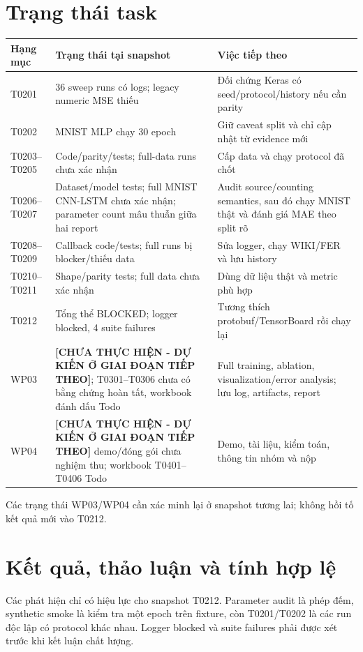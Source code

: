 \section{Trạng thái task}
\begin{longtable}{p{}p{}p{}}
\toprule Hạng mục & Trạng thái tại snapshot & Việc tiếp theo \\
\midrule
T0201 & 36 sweep runs có logs; legacy numeric MSE thiếu & Đối chứng Keras có seed/protocol/history nếu cần parity \\
T0202 & MNIST MLP chạy 30 epoch & Giữ caveat split và chỉ cập nhật từ evidence mới \\
T0203--T0205 & Code/parity/tests; full-data runs chưa xác nhận & Cấp data và chạy protocol đã chốt \\
T0206--T0207 & Dataset/model tests; full MNIST CNN-LSTM chưa xác nhận; parameter count mâu thuẫn giữa hai report & Audit source/counting semantics, sau đó chạy MNIST thật và đánh giá MAE theo split rõ \\
T0208--T0209 & Callback code/tests; full runs bị blocker/thiếu data & Sửa logger, chạy WIKI/FER và lưu history \\
T0210--T0211 & Shape/parity tests; full data chưa xác nhận & Dùng dữ liệu thật và metric phù hợp \\
T0212 & Tổng thể BLOCKED; logger blocked, 4 suite failures & Tương thích protobuf/TensorBoard rồi chạy lại \\
WP03 & \textbf{[CHƯA THỰC HIỆN - DỰ KIẾN Ở GIAI ĐOẠN TIẾP THEO]}; T0301--T0306 chưa có bằng chứng hoàn tất, workbook đánh dấu Todo & Full training, ablation, visualization/error analysis; lưu log, artifacts, report \\
WP04 & \textbf{[CHƯA THỰC HIỆN - DỰ KIẾN Ở GIAI ĐOẠN TIẾP THEO]} demo/đóng gói chưa nghiệm thu; workbook T0401--T0406 Todo & Demo, tài liệu, kiểm toán, thông tin nhóm và nộp \\
\bottomrule
\end{longtable}
Các trạng thái WP03/WP04 cần xác minh lại ở snapshot tương lai; không hồi tố kết quả mới vào T0212.

\section{Kết quả, thảo luận và tính hợp lệ}
Các phát hiện chỉ có hiệu lực cho snapshot T0212. Parameter audit là phép đếm, synthetic smoke là kiểm tra một epoch trên fixture, còn T0201/T0202 là các run độc lập có protocol khác nhau. Logger blocked và suite failures phải được xét trước khi kết luận chất lượng.

